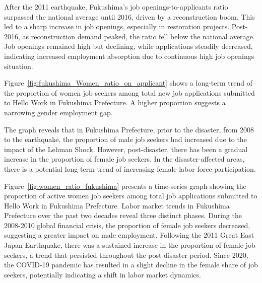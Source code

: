 \documentclass[a4paper,12pt]{article}
\begin{document}
After the 2011 earthquake, Fukushima's job openings-to-applicants ratio surpassed the national average until 2016, driven by a reconstruction boom. This led to a sharp increase in job openings, especially in restoration projects. Post-2016, as reconstruction demand peaked, the ratio fell below the national average. Job openings remained high but declining, while applications steadily decreased, indicating increased employment absorption due to continuous high job openings situation.



Figure~\ref{fig:fukushima_Women_ratio_on_applicant} shows a long-term trend of the proportion of women job seekers among total new job applications submitted to Hello Work in Fukushima Prefecture. A higher proportion suggests a narrowing gender employment gap. 


The graph reveals that in Fukushima Prefecture, prior to the disaster, from 2008 to the earthquake, the proportion of male job seekers had increased due to the impact of the Lehman Shock. However, post-disaster, there has been a gradual increase in the proportion of female job seekers. In the disaster-affected areas, there is a potential long-term trend of increasing female labor force participation.

Figure~\ref{fig:women_ratio_fukushima} presents a time-series graph showing the proportion of active women job seekers among total job applications submitted to Hello Work in Fukushima Prefecture. Labor market trends in Fukushima Prefecture over the past two decades reveal three distinct phases. During the 2008-2010 global financial crisis, the proportion of female job seekers decreased, suggesting a greater impact on male employment. Following the 2011 Great East Japan Earthquake, there was a sustained increase in the proportion of female job seekers, a trend that persisted throughout the post-disaster period. Since 2020, the COVID-19 pandemic has resulted in a slight decline in the female share of job seekers, potentially indicating a shift in labor market dynamics.
\end{document}
